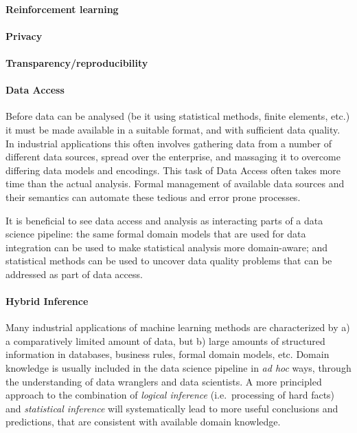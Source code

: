 \documentclass[a4paper,10pt]{article}
\begin{document}
\paragraph{Reinforcement learning}

\paragraph{Privacy}

\paragraph{Transparency/reproducibility}


\paragraph{Data Access}

Before data can be analysed (be it using statistical methods, finite elements, etc.) it must be made available in a suitable format, and with sufficient data quality.  In industrial applications this often involves gathering data from a number of different data sources, spread over the enterprise, and massaging it to overcome differing data models and encodings.  This task of Data Access often takes more time than the actual analysis.  Formal management of available data sources and their semantics can automate these tedious and error prone processes.

It is beneficial to see data access and analysis as interacting parts of a data science pipeline: the same formal domain models that are used for data integration can be used to make statistical analysis more domain-aware; and statistical methods can be used to uncover data quality problems that can be addressed as part of data access.

\paragraph{Hybrid Inference}

Many industrial applications of machine learning methods are characterized by a) a comparatively limited amount of data, but b) large amounts of structured information in databases, business rules, formal domain models, etc.  Domain knowledge is usually included in the data science pipeline in \emph{ad hoc} ways, through the understanding of data wranglers and data scientists.  A more principled approach to the combination of \emph{logical inference} (i.e.~processing of hard facts) and \emph{statistical inference} will systematically lead to more useful conclusions and predictions, that are consistent with available domain knowledge.
\end{document}

